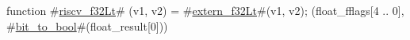 function #\hyperref[sailRISCVzriscvzyf32Lt]{riscv\_f32Lt}# (v1, v2) = {
  #\hyperref[sailRISCVzexternzyf32Lt]{extern\_f32Lt}#(v1, v2);
  (float_fflags[4 .. 0], #\hyperref[sailRISCVzbitzytozybool]{bit\_to\_bool}#(float_result[0]))
}
